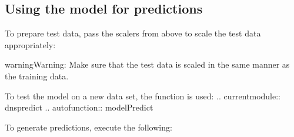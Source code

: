 \documentclass[letterpaper,10pt,english]{sphinxmanual}
\begin{document}
\subsection{Using the model for predictions}
\label{\detokenize{manual:using-the-model-for-predictions}}
To prepare test data, pass the scalers from above to scale the test data appropriately:

\begin{sphinxVerbatim}[commandchars=\\\{\}]
  
  

  \PYG{p}{[}\PYG{p}{]}
  \PYG{p}{[}\PYG{p}{]}
  
                         
\end{sphinxVerbatim}

\begin{sphinxadmonition}{warning}{Warning:}
Make sure that the test data is scaled in the same manner as the training data.
\end{sphinxadmonition}

To test the model on a new data set, the function  is used:
.. currentmodule:: dnspredict
.. autofunction:: modelPredict

To generate predictions, execute the following:

\begin{sphinxVerbatim}[commandchars=\\\{\}]
  \PYG{p}{[}\PYG{p}{]}
\end{sphinxVerbatim}
\end{document}

